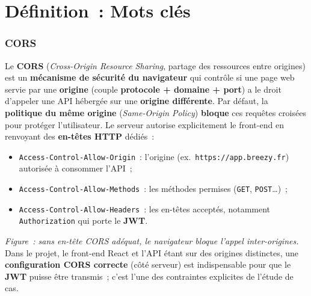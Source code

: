 \newpage

\section*{Définition~: Mots clés}
{}

\subsubsection*{CORS}
{}

\noindent Le \textbf{CORS} (\textit{Cross-Origin Resource Sharing}, \og{}partage des ressources entre origines\fg{}) est un \textbf{mécanisme de sécurité du navigateur} qui contrôle si une page web servie par une \textbf{origine} (couple \textbf{protocole + domaine + port}) a le droit d'appeler une API hébergée sur une \textbf{origine différente}. Par défaut, la \textbf{politique du même origine} (\textit{Same-Origin Policy}) \textbf{bloque} ces requêtes croisées pour protéger l'utilisateur. Le serveur autorise explicitement le front-end en renvoyant des \textbf{en-têtes HTTP} dédiés~:
\begin{itemize}
	\item \texttt{Access-Control-Allow-Origin}~: l'origine (ex.~\texttt{https://app.breezy.fr}) autorisée à consommer l'API~;
	\item \texttt{Access-Control-Allow-Methods}~: les méthodes permises (\texttt{GET}, \texttt{POST}…)~;
	\item \texttt{Access-Control-Allow-Headers}~: les en-têtes acceptés, notamment \texttt{Authorization} qui porte le \textbf{JWT}.
\end{itemize}
\begin{center}
\end{center}
\noindent\textit{Figure~: sans en-tête CORS adéquat, le navigateur bloque l'appel inter-origines.} Dans le projet, le front-end React et l'API étant sur des origines distinctes, une \textbf{configuration CORS correcte} (côté serveur) est indispensable pour que le \textbf{JWT} puisse être transmis~; c'est l'une des contraintes explicites de l'étude de cas.

